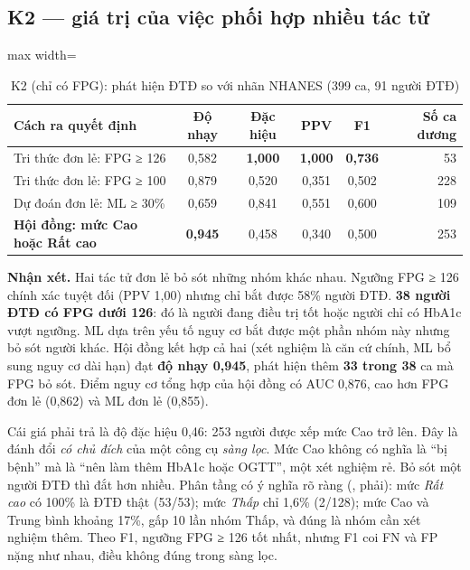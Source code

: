 \subsection{K2 — giá trị của việc phối hợp nhiều tác tử}

\begin{table}[H]
\centering
\caption{K2 (chỉ có FPG): phát hiện ĐTĐ so với nhãn NHANES (399 ca, 91 người ĐTĐ)}
\label{tab:k2}
\small
\begin{adjustbox}{max width=\linewidth}
\begin{tabular}{@{}lccccr@{}}
\toprule
\textbf{Cách ra quyết định} & \textbf{Độ nhạy} & \textbf{Đặc hiệu} & \textbf{PPV} & \textbf{F1} & \textbf{Số ca dương} \\
\midrule
Tri thức đơn lẻ: FPG ≥ 126 & 0,582 & \textbf{1,000} & \textbf{1,000} & \textbf{0,736} & 53 \\
Tri thức đơn lẻ: FPG ≥ 100 & 0,879 & 0,520 & 0,351 & 0,502 & 228 \\
Dự đoán đơn lẻ: ML ≥ 30\% & 0,659 & 0,841 & 0,551 & 0,600 & 109 \\
\textbf{Hội đồng: mức Cao hoặc Rất cao} & \textbf{0,945} & 0,458 & 0,340 & 0,500 & 253 \\
\bottomrule
\end{tabular}
\end{adjustbox}
\end{table}


\textbf{Nhận xét.} Hai tác tử đơn lẻ bỏ sót những nhóm khác nhau. Ngưỡng FPG ≥ 126 chính xác tuyệt đối (PPV 1,00) nhưng chỉ bắt được 58\% người ĐTĐ. \textbf{38 người ĐTĐ có FPG dưới 126}: đó là người đang điều trị tốt hoặc người chỉ có HbA1c vượt ngưỡng. ML dựa trên yếu tố nguy cơ bắt được một phần nhóm này nhưng bỏ sót người khác. Hội đồng kết hợp cả hai (xét nghiệm là căn cứ chính, ML bổ sung nguy cơ dài hạn) đạt \textbf{độ nhạy 0,945}, phát hiện thêm \textbf{33 trong 38} ca mà FPG bỏ sót. Điểm nguy cơ tổng hợp của hội đồng có AUC 0,876, cao hơn FPG đơn lẻ (0,862) và ML đơn lẻ (0,855).

Cái giá phải trả là độ đặc hiệu 0,46: 253 người được xếp mức Cao trở lên. Đây là đánh đổi \emph{có chủ đích} của một công cụ \emph{sàng lọc}. Mức Cao không có nghĩa là ``bị bệnh'' mà là ``nên làm thêm HbA1c hoặc OGTT'', một xét nghiệm rẻ. Bỏ sót một người ĐTĐ thì đắt hơn nhiều. Phân tầng có ý nghĩa rõ ràng (, phải): mức \emph{Rất cao} có 100\% là ĐTĐ thật (53/53); mức \emph{Thấp} chỉ 1,6\% (2/128); mức Cao và Trung bình khoảng 17\%, gấp 10 lần nhóm Thấp, và đúng là nhóm cần xét nghiệm thêm. Theo F1, ngưỡng FPG ≥ 126 tốt nhất, nhưng F1 coi FN và FP nặng như nhau, điều không đúng trong sàng lọc.

